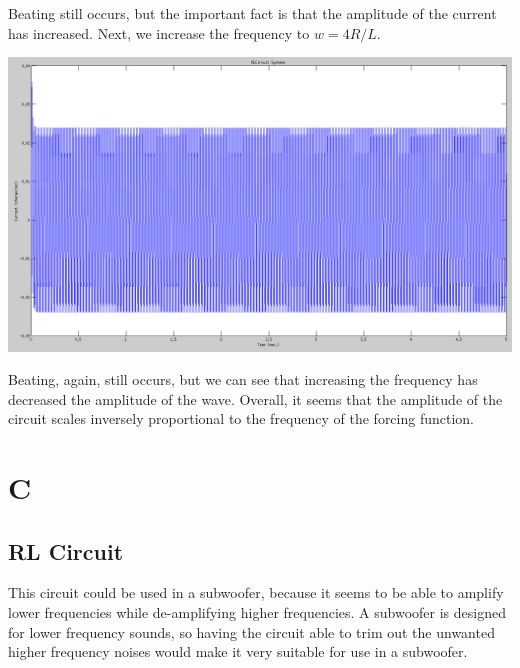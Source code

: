 \documentclass[titlepage,12pt]{article}
\begin{document}
\noindent Beating still occurs, but the important fact is that the amplitude of the current has increased. Next, we increase the frequency to $w = 4R/L$.

\begin{center}
  \includegraphics[scale=0.25]{r10l01w4rl.png}
\end{center}

\noindent Beating, again, still occurs, but we can see that increasing the frequency has decreased the amplitude of the wave. Overall, it seems that the amplitude of the circuit scales inversely proportional to the frequency of the forcing function.

\section*{C}

\subsection*{RL Circuit}
\noindent This circuit could be used in a subwoofer, because it seems to be able to amplify lower frequencies while de-amplifying higher frequencies. A subwoofer is designed for lower frequency sounds, so having the circuit able to trim out the unwanted higher frequency noises would make it very suitable for use in a subwoofer.
\end{document}
